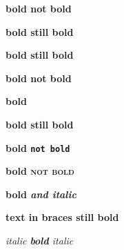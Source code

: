 \documentclass[12pt]{article}
\newcommand\"{quote}
\begin{document}
\textbf{bold \textnormal{not bold}}


\textbf{bold \textsf{still bold}}

\textbf{bold \textup{still bold}}

\textbf{bold \textmd{not bold}}

\textbf{bold }

\textbf{bold \textbf{still bold}}

\textbf{bold \texttt{not bold}}

\textbf{bold \textsc{not bold}}

\textbf{bold \emph{and italic}}

\textbf{text {in braces} still bold}

\textit{italic \textbf{bold} italic}
\end{document}
